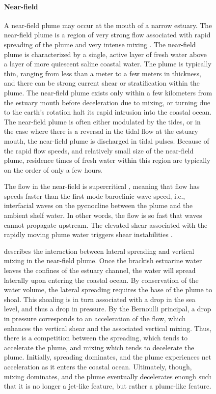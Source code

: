 \documentclass[11pt]{report}
\numberwithin{equation}{section}
\begin{document}
\begin{figure}
\paragraph{Near-field}
A near-field plume may occur at the mouth of a narrow estuary.  The near-field plume is a region of very strong flow associated with rapid spreading of the plume and very intense mixing \citep{hetland:10a, nash.ea:09, macdonald.geyer:04}.  The near-field plume is characterized by a single, active layer of fresh water above a layer of more quiescent saline coastal water.  The plume is typically thin, ranging from less than a meter to a few meters in thickness, and there can be strong current shear or stratification within the plume.  The near-field plume exists only within a few kilometers from the estuary mouth before deceleration due to mixing, or turning due to the earth's rotation halt its rapid intrusion into the coastal ocean.  The near-field plume is often either modulated by the tides, or in the case where there is a reversal in the tidal flow at the estuary mouth, the near-field plume is discharged in tidal pulses.  Because of the rapid flow speeds, and relatively small size of the near-field plume, residence times of fresh water within this region are typically on the order of only a few hours.

The flow in the near-field is supercritical \citep[see, e.g.,][]{armi.farmer:86}, meaning that flow has speeds faster than the first-mode baroclinic wave speed, i.e., interfacial waves on the pycnocline between the plume and the ambient shelf water.  In other words, the flow is so fast that waves cannot propagate upstream.  The elevated shear associated with the rapidly moving plume water triggers shear instabilities \citep{ivey.imberger:91, macdonald.geyer:05}.

\citet{hetland:10} describes the interaction between lateral spreading and vertical mixing in the near-field plume.  Once the brackish estuarine water leaves the confines of the estuary channel, the water will spread laterally upon entering the coastal ocean.  By conservation of the water volume, the lateral spreading requires the base of the plume to shoal.  This shoaling is in turn associated with a drop in the sea level, and thus a drop in pressure.  By the Bernoulli principal, a drop in pressure corresponds to an acceleration of the flow, which enhances the vertical shear and the associated vertical mixing.  Thus, there is a competition between the spreading, which tends to accelerate the plume, and mixing which tends to decelerate the plume.  Initially, spreading dominates, and the plume experiences net acceleration as it enters the coastal ocean.  Ultimately, though, mixing dominates, and the plume eventually decelerates enough such that it is no longer a jet-like feature, but rather a plume-like feature.



\end{figure}
\end{document}
